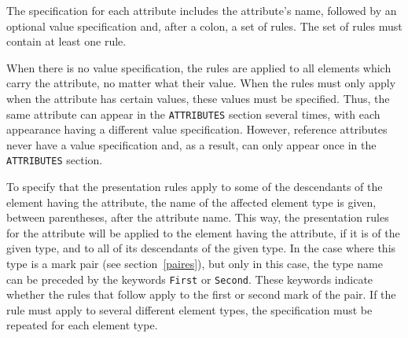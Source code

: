 The specification for each attribute includes the attribute's name,
followed by an optional value specification and, after a colon, a
set of rules.  The set of rules must contain at least one rule.

When there is no value specification, the rules are applied to all
elements which carry the attribute, no matter what their value.  When
the rules must only apply when the attribute has certain values, these
values must be specified.  Thus, the same attribute can appear in the
{\tt ATTRIBUTES} section several times, with each appearance having a
different value specification.  However, reference attributes never
have a value specification and, as a result, can only appear once in
the {\tt ATTRIBUTES} section.

To specify that the presentation rules apply to some of the
descendants of the element having the attribute,
the name of the affected element type is given,
between parentheses, after the attribute name.  This way, the
presentation rules for the attribute will be applied to the
element having the attribute, if it is of the given type, and to all of its descendants of the given type.
In the case where this type is a mark pair (see
section~\ref{paires}), but only in this case, the type name can be
preceded by the keywords {\tt First} or {\tt Second}.  These keywords
indicate whether the rules that follow apply to the first or second
mark of the pair.
If the rule must apply to several different element
types, the specification must be repeated for each element type.

